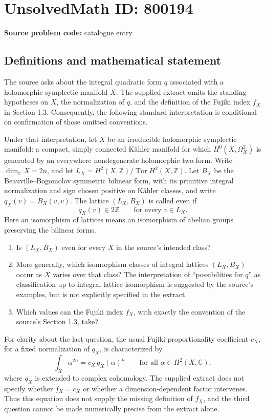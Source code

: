 \documentclass[11pt]{article}
\newcommand{\Z}{\mathbb{Z}}
\newcommand{\C}{\mathbb{C}}
\begin{document}
\section*{UnsolvedMath ID: 800194}
\textbf{Source problem code:} catalogue entry
\subsection{Definitions and mathematical statement}
The source asks about the integral quadratic form \(q\) associated with a holomorphic symplectic manifold \(X\). The supplied extract omits the standing hypotheses on \(X\), the normalization of \(q\), and the definition of the Fujiki index \(f_X\) in Section 1.3. Consequently, the following standard interpretation is conditional on confirmation of those omitted conventions.

Under that interpretation, let \(X\) be an irreducible holomorphic symplectic manifold: a compact, simply connected Kähler manifold for which \(H^0(X,\Omega_X^2)\) is generated by an everywhere nondegenerate holomorphic two-form. Write \(\dim_{\C}X=2n\), and let \(L_X=H^2(X,\Z)/\operatorname{Tor}H^2(X,\Z)\). Let \(B_X\) be the Beauville--Bogomolov symmetric bilinear form, with its primitive integral normalization and sign chosen positive on Kähler classes, and write \(q_X(v)=B_X(v,v)\). The lattice \((L_X,B_X)\) is called even if
\[
q_X(v)\in 2\Z\qquad\text{for every }v\in L_X.
\]
Here an isomorphism of lattices means an isomorphism of abelian groups preserving the bilinear forms.

\begin{enumerate}
\item Is \((L_X,B_X)\) even for every \(X\) in the source's intended class?
\item More generally, which isomorphism classes of integral lattices \((L_X,B_X)\) occur as \(X\) varies over that class? The interpretation of ``possibilities for \(q\)'' as classification up to integral lattice isomorphism is suggested by the source's examples, but is not explicitly specified in the extract.
\item Which values can the Fujiki index \(f_X\), with exactly the convention of the source's Section 1.3, take?
\end{enumerate}

For clarity about the last question, the usual Fujiki proportionality coefficient \(c_X\), for a fixed normalization of \(q_X\), is characterized by
\[
\int_X\alpha^{2n}=c_X\,q_X(\alpha)^n
\qquad\text{for all }\alpha\in H^2(X,\C),
\]
where \(q_X\) is extended to complex cohomology. The supplied extract does not specify whether \(f_X=c_X\) or whether a dimension-dependent factor intervenes. Thus this equation does not supply the missing definition of \(f_X\), and the third question cannot be made numerically precise from the extract alone.
\end{document}
